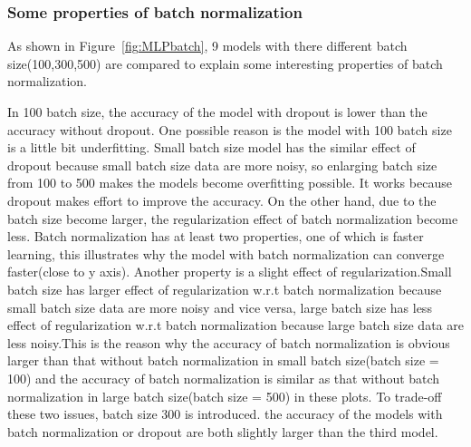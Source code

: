 \documentclass[12pt,letterpaper]{article}
\begin{document}
\subsubsection{Some properties of batch normalization}

As shown in Figure~\ref{fig:MLPbatch}, 9 models with there different batch size(100,300,500) are compared to explain some interesting properties of batch normalization.

In 100 batch size, the accuracy of the model with dropout is lower than the accuracy without dropout. One possible reason is the model with 100 batch size is a little bit underfitting. Small batch size model has the similar effect of dropout because small batch size data are more noisy, so enlarging batch size from 100 to 500 makes the models become overfitting possible. It works because dropout makes effort to improve the accuracy. On the other hand, due to the batch size become larger, the regularization effect of batch normalization become less. Batch normalization has at least two properties, one of which is faster learning, this illustrates why the model with batch normalization can converge faster(close to y axis). Another property is a slight effect of regularization.Small batch size has larger effect of regularization w.r.t batch normalization because small batch size data are more noisy and vice versa, large batch size has less effect of regularization w.r.t batch normalization because large batch size data are less noisy.This is the reason why the accuracy of batch normalization is obvious larger than that without batch normalization in small batch size(batch size = 100) and the accuracy of batch normalization is similar as that without batch normalization in large batch size(batch size = 500) in these plots. To trade-off these two issues, batch size 300 is introduced. the accuracy of the models with batch normalization or dropout are both slightly larger than the third model.
\end{document}
